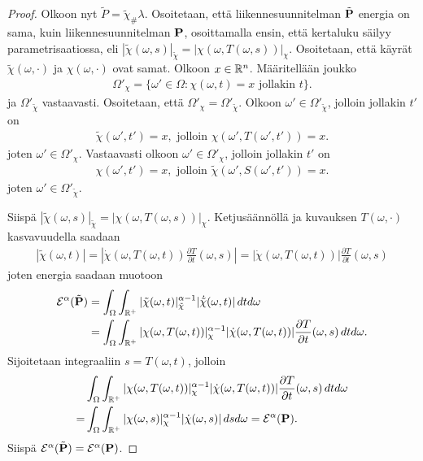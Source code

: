 \documentclass[12pt,oneside,a4paper]{amsbook} %
\begin{document}
\begin{proof}
     Olkoon nyt $\tilde P = \tilde \chi_\# \lambda$. Osoitetaan, että liikennesuunnitelman $\tilde \P$ energia on sama, kuin liikennesuunnitelman $\P$, osoittamalla ensin, että kertaluku säilyy parametrisaatiossa, eli $|\tilde \chi(\omega, s)|_{\tilde \chi} = |\chi(\omega, T(\omega, s))|_\chi$. Osoitetaan, että käyrät $\tilde \chi(\omega, \cdot)$ ja $\chi(\omega, \cdot)$ ovat samat. Olkoon $x \in \R^n$. Määritellään joukko
    \begin{align*}
        \Omega'_\chi = \{\omega' \in \Omega : \chi(\omega, t) = x \text{ jollakin } t\}.
    \end{align*}
    ja $\Omega'_{\tilde \chi}$ vastaavasti. Osoitetaan, että $\Omega'_\chi = \Omega'_{\tilde \chi}$. Olkoon $\omega' \in \Omega'_{\tilde \chi}$, jolloin jollakin $t'$ on
    \begin{align*}
        \tilde \chi(\omega', t') = x, \text{ jolloin }  \chi(\omega', T(\omega', t')) = x.
    \end{align*}
    joten $\omega' \in \Omega'_\chi$. Vastaavasti olkoon $\omega' \in \Omega'_{ \chi}$, jolloin jollakin $t'$ on
    \begin{align*}
        \chi(\omega', t') = x, \text{ jolloin }  \tilde\chi(\omega', S(\omega', t')) = x.
    \end{align*}
    joten $\omega' \in \Omega'_{\tilde \chi}$. 
    
    Siispä $|\tilde \chi(\omega, s)|_{\tilde \chi} = |\chi(\omega, T(\omega, s))|_\chi$. Ketjusäännöllä ja kuvauksen $T(\omega, \cdot)$ kasvavuudella saadaan 
    \begin{align*}
       |\tilde \chi(\omega, t)| = |\dot \chi(\omega, T(\omega, t)) \frac{\partial T}{\partial t}(\omega, s)| = |\dot \chi(\omega, T(\omega, t))| \frac{\partial T}{\partial t}(\omega, s)
    \end{align*}
    joten energia saadaan muotoon 
    \begin{align*}
        \E^\alpha(\tilde \P) &= \int_\Omega \int_{\R^+} |\tilde \chi(\omega, t)|_{\tilde \chi}^{\alpha-1}|\dot{\tilde{\chi}}(\omega, t)|\, dtd\omega \\
        &= \int_\Omega \int_{\R^+} |\chi(\omega, T(\omega, t))|_{\chi}^{\alpha-1} |\dot \chi(\omega, T(\omega, t))| \frac{\partial T}{\partial t}(\omega, s) \, dtd\omega. 
    \end{align*}
    Sijoitetaan integraaliin $s = T(\omega, t)$, jolloin
    \begin{align*}
        &\int_\Omega \int_{\R^+} |\chi(\omega, T(\omega, t))|_{\chi}^{\alpha-1} |\dot \chi(\omega, T(\omega, t))| \frac{\partial T}{\partial t}(\omega, s) \, dtd\omega \\
         =  &\int_\Omega \int_{\R^+} |\chi(\omega, s)|_{\chi}^{\alpha-1} |\dot \chi(\omega, s)| \, dsd\omega = \E^\alpha(\P).
    \end{align*}
    Siispä $\E^\alpha(\tilde \P) = \E^\alpha(\P)$.
    
\end{proof}
\end{document}
